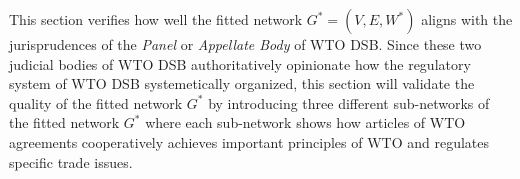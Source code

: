 This section verifies
how well the fitted network $G^* = (V, E, W^*)$
aligns with the jurisprudences of the \textit{Panel} or \textit{Appellate Body} of WTO DSB.
Since these two judicial bodies of WTO DSB authoritatively
opinionate how the regulatory system of WTO DSB systemetically organized,
this section will validate the quality of the fitted network $G^*$ by 
introducing three different sub-networks of 
the fitted network $G^*$ where each sub-network shows how articles of WTO agreements 
cooperatively achieves important principles of WTO and regulates specific trade issues. 


